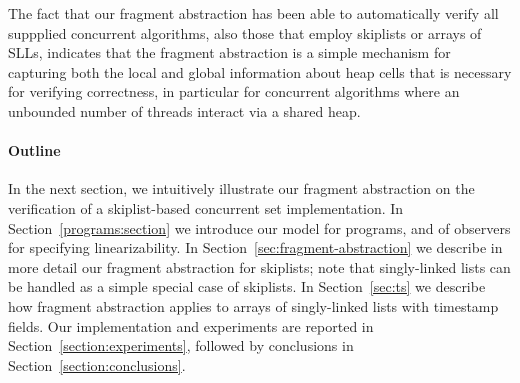 The fact that our fragment abstraction has been able to automatically verify all
suppplied concurrent algorithms, also those that employ skiplists or
arrays of SLLs, indicates that the fragment abstraction is a simple
mechanism for capturing both the local and global information about heap cells
that is necessary for verifying correctness, in particular for
concurrent algorithms where an unbounded number of threads interact
via a shared heap.

\paragraph{Outline}
In the next section, we intuitively illustrate our fragment abstraction on the
verification of a skiplist-based concurrent set implementation.
In Section~\ref{programs:section} we introduce our model for programs,
and of observers for specifying linearizability. In 
Section~\ref{sec:fragment-abstraction} we describe in more detail our
fragment abstraction for skiplists; note that singly-linked lists can
be handled as a simple special case of skiplists.
In Section~\ref{sec:ts} we describe how fragment abstraction applies to
arrays of singly-linked lists with timestamp fields.
Our implementation and
experiments are reported in Section~\ref{section:experiments}, followed
by conclusions in Section~\ref{section:conclusions}.




